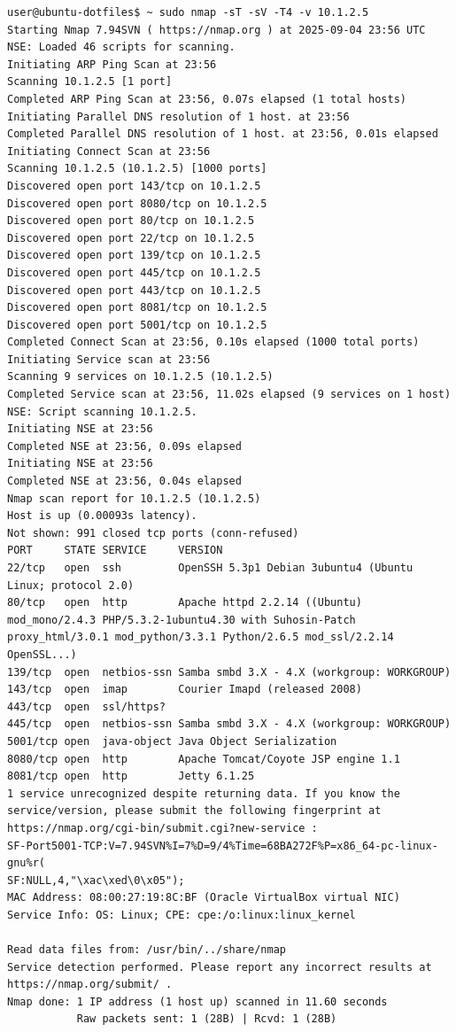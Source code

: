 \documentclass[12pt]{article}
\begin{document}
\begin{lstlisting}
user@ubuntu-dotfiles$ ~ sudo nmap -sT -sV -T4 -v 10.1.2.5
Starting Nmap 7.94SVN ( https://nmap.org ) at 2025-09-04 23:56 UTC
NSE: Loaded 46 scripts for scanning.
Initiating ARP Ping Scan at 23:56
Scanning 10.1.2.5 [1 port]
Completed ARP Ping Scan at 23:56, 0.07s elapsed (1 total hosts)
Initiating Parallel DNS resolution of 1 host. at 23:56
Completed Parallel DNS resolution of 1 host. at 23:56, 0.01s elapsed
Initiating Connect Scan at 23:56
Scanning 10.1.2.5 (10.1.2.5) [1000 ports]
Discovered open port 143/tcp on 10.1.2.5
Discovered open port 8080/tcp on 10.1.2.5
Discovered open port 80/tcp on 10.1.2.5
Discovered open port 22/tcp on 10.1.2.5
Discovered open port 139/tcp on 10.1.2.5
Discovered open port 445/tcp on 10.1.2.5
Discovered open port 443/tcp on 10.1.2.5
Discovered open port 8081/tcp on 10.1.2.5
Discovered open port 5001/tcp on 10.1.2.5
Completed Connect Scan at 23:56, 0.10s elapsed (1000 total ports)
Initiating Service scan at 23:56
Scanning 9 services on 10.1.2.5 (10.1.2.5)
Completed Service scan at 23:56, 11.02s elapsed (9 services on 1 host)
NSE: Script scanning 10.1.2.5.
Initiating NSE at 23:56
Completed NSE at 23:56, 0.09s elapsed
Initiating NSE at 23:56
Completed NSE at 23:56, 0.04s elapsed
Nmap scan report for 10.1.2.5 (10.1.2.5)
Host is up (0.00093s latency).
Not shown: 991 closed tcp ports (conn-refused)
PORT     STATE SERVICE     VERSION
22/tcp   open  ssh         OpenSSH 5.3p1 Debian 3ubuntu4 (Ubuntu Linux; protocol 2.0)
80/tcp   open  http        Apache httpd 2.2.14 ((Ubuntu) mod_mono/2.4.3 PHP/5.3.2-1ubuntu4.30 with Suhosin-Patch proxy_html/3.0.1 mod_python/3.3.1 Python/2.6.5 mod_ssl/2.2.14 OpenSSL...)
139/tcp  open  netbios-ssn Samba smbd 3.X - 4.X (workgroup: WORKGROUP)
143/tcp  open  imap        Courier Imapd (released 2008)
443/tcp  open  ssl/https?
445/tcp  open  netbios-ssn Samba smbd 3.X - 4.X (workgroup: WORKGROUP)
5001/tcp open  java-object Java Object Serialization
8080/tcp open  http        Apache Tomcat/Coyote JSP engine 1.1
8081/tcp open  http        Jetty 6.1.25
1 service unrecognized despite returning data. If you know the service/version, please submit the following fingerprint at https://nmap.org/cgi-bin/submit.cgi?new-service :
SF-Port5001-TCP:V=7.94SVN%I=7%D=9/4%Time=68BA272F%P=x86_64-pc-linux-gnu%r(
SF:NULL,4,"\xac\xed\0\x05");
MAC Address: 08:00:27:19:8C:BF (Oracle VirtualBox virtual NIC)
Service Info: OS: Linux; CPE: cpe:/o:linux:linux_kernel

Read data files from: /usr/bin/../share/nmap
Service detection performed. Please report any incorrect results at https://nmap.org/submit/ .
Nmap done: 1 IP address (1 host up) scanned in 11.60 seconds
           Raw packets sent: 1 (28B) | Rcvd: 1 (28B)
\end{lstlisting}
\end{document}

